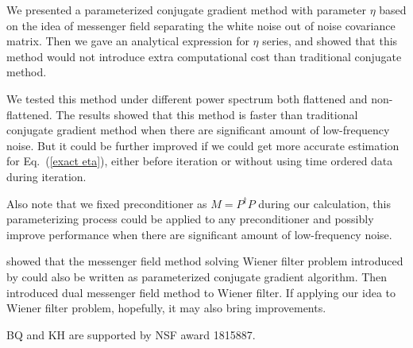 \documentclass[twocolumn,linenumbers]{aastex631}
\newcommand{\Pdagger}{P^{\dagger}}
\begin{document}
We presented a parameterized conjugate gradient method with parameter $\eta$ based on the idea of messenger field
separating the white noise out of noise covariance matrix.
Then we gave an analytical expression for $\eta$ series,
and showed that this method would not introduce extra computational cost than traditional conjugate method.

We tested this method under different power spectrum both flattened and non-flattened.
The results showed that this method is faster than traditional conjugate gradient method 
when there are significant amount of low-frequency noise.
But it could be further improved if we could get more accurate estimation for Eq.~(\ref{exact eta}),
either before iteration or without using time ordered data during iteration.

Also note that we fixed preconditioner as $M = \Pdagger P$ during our calculation,
this parameterizing process could be applied to any preconditioner and possibly improve performance when 
there are significant amount of low-frequency noise.

\citet{2018A&A...620A..59P} showed that the messenger field method solving Wiener
filter problem introduced by \cite{2013A&A...549A.111E} could also be written as 
parameterized conjugate gradient algorithm.
Then \citet{2017MNRAS.468.1782K} introduced dual messenger field method to Wiener filter.
If applying our idea to Wiener filter problem, hopefully, it may also bring improvements.













\begin{acknowledgments}
BQ and KH are supported by NSF award 1815887.
\end{acknowledgments}

%
\end{document}
